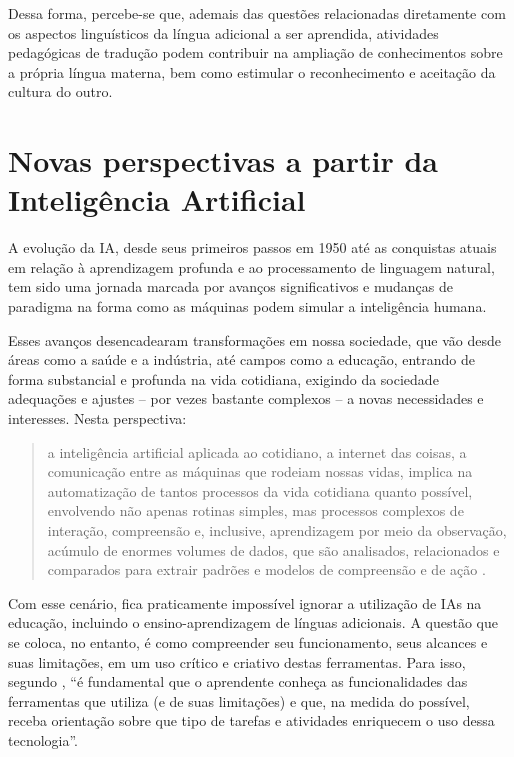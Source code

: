 \documentclass[portuguese]{textolivre}
\begin{document}
Dessa forma, percebe-se que, ademais das questões relacionadas diretamente com os aspectos linguísticos da língua adicional a ser aprendida, atividades pedagógicas de tradução podem contribuir na ampliação de conhecimentos sobre a própria língua materna, bem como estimular o reconhecimento e aceitação da cultura do outro.

\section{Novas perspectivas a partir da Inteligência Artificial}\label{sec-3}
A evolução da IA, desde seus primeiros passos em 1950 até as conquistas atuais em relação à aprendizagem profunda e ao processamento de linguagem natural, tem sido uma jornada marcada por avanços significativos e mudanças de paradigma na forma como as máquinas podem simular a inteligência humana.

Esses avanços desencadearam transformações em nossa sociedade, que vão desde áreas como a saúde e a indústria, até campos como a educação, entrando de forma substancial e profunda na vida cotidiana, exigindo da sociedade adequações e ajustes -- por vezes bastante complexos -- a novas necessidades e interesses. Nesta perspectiva:

\begin{quote}
a inteligência artificial aplicada ao cotidiano, a internet das coisas, a comunicação entre as máquinas que rodeiam nossas vidas, implica na automatização de tantos processos da vida cotidiana quanto possível, envolvendo não apenas rotinas simples, mas processos complexos de interação, compreensão e, inclusive, aprendizagem por meio da observação, acúmulo de enormes volumes de dados, que são analisados, relacionados e comparados para extrair padrões e modelos de compreensão e de ação \cite[p. 61]{perezgomez2021}.
\end{quote}

Com esse cenário, fica praticamente impossível ignorar a utilização de IAs na educação, incluindo o ensino-aprendizagem de línguas adicionais. A questão que se coloca, no entanto, é como compreender seu funcionamento, seus alcances e suas limitações, em um uso crítico e criativo destas ferramentas. Para isso, segundo \textcite[p. 357, tradução nossa]{munozbasols2024}, “é fundamental que o aprendente conheça as funcionalidades das ferramentas que utiliza (e de suas limitações) e que, na medida do possível, receba orientação sobre que tipo de tarefas e atividades enriquecem o uso dessa tecnologia”.
\end{document}
